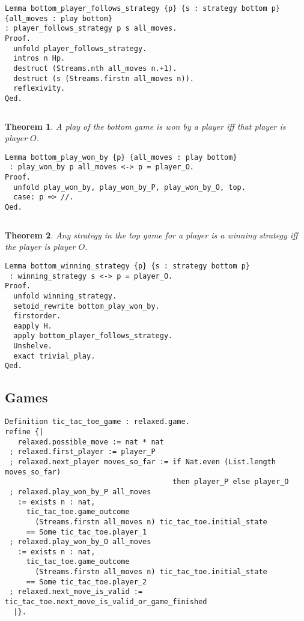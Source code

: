 \documentclass{article}
\newtheorem{thm}{Theorem}
\theoremstyle{definition}
\begin{document}
\begin{verbatim}
Lemma bottom_player_follows_strategy {p} {s : strategy bottom p} {all_moves : play bottom} 
: player_follows_strategy p s all_moves.
Proof.
  unfold player_follows_strategy.
  intros n Hp.
  destruct (Streams.nth all_moves n.+1).
  destruct (s (Streams.firstn all_moves n)).
  reflexivity.
Qed.
\end{verbatim}

$\left.\right.$

\begin{thm}
A play of the bottom game is won by a player iff that player is player $O$.
\end{thm}

\begin{verbatim}
Lemma bottom_play_won_by {p} {all_moves : play bottom}
 : play_won_by p all_moves <-> p = player_O.
Proof.
  unfold play_won_by, play_won_by_P, play_won_by_O, top.
  case: p => //.
Qed.
\end{verbatim}
$\left.\right.$

\begin{thm}
Any strategy in the top game for a player is a winning strategy iff the player is player $O$. 
\end{thm}

\begin{verbatim}
Lemma bottom_winning_strategy {p} {s : strategy bottom p}
 : winning_strategy s <-> p = player_O.
Proof.
  unfold winning_strategy.
  setoid_rewrite bottom_play_won_by.
  firstorder.
  eapply H.
  apply bottom_player_follows_strategy.
  Unshelve.
  exact trivial_play.
Qed. 
\end{verbatim}
\subsection{Games}

\begin{verbatim}
Definition tic_tac_toe_game : relaxed.game.
refine {|
   relaxed.possible_move := nat * nat
 ; relaxed.first_player := player_P
 ; relaxed.next_player moves_so_far := if Nat.even (List.length moves_so_far) 
                                       then player_P else player_O
 ; relaxed.play_won_by_P all_moves 
   := exists n : nat,
     tic_tac_toe.game_outcome
       (Streams.firstn all_moves n) tic_tac_toe.initial_state
     == Some tic_tac_toe.player_1
 ; relaxed.play_won_by_O all_moves 
   := exists n : nat,
     tic_tac_toe.game_outcome
       (Streams.firstn all_moves n) tic_tac_toe.initial_state
     == Some tic_tac_toe.player_2
 ; relaxed.next_move_is_valid := tic_tac_toe.next_move_is_valid_or_game_finished
  |}.
\end{verbatim}
\end{document}
